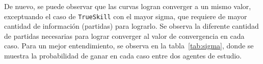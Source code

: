 \documentclass[11pt,twoside,spanish]{report} %
\begin{document}
De nuevo, se puede observar que las curvas logran converger a un mismo valor, exceptuando el caso de \texttt{TrueSkill} con el mayor sigma, que requiere de mayor cantidad de informaci\'on (partidas) para lograrlo.
Se observa la diferente cantidad de partidas necesarias para lograr converger al valor de convergencia en cada caso.
Para un mejor entendimiento, se observa en la tabla~\ref{tab:sigma}, donde se muestra la probabilidad de ganar en cada caso entre dos agentes de estudio.

\begin{table}[H]
\centering
{}
\end{table}
\end{document}
